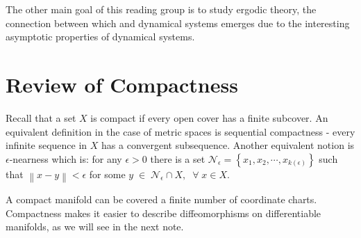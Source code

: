 \documentclass[11pt]{article}
\newcommand{\norm}[1]{\left\lVert#1\right\rVert}
\begin{document}
The other main goal of this reading group is to study ergodic theory, the connection between 
which and dynamical systems emerges due to the interesting asymptotic
properties of dynamical systems. 


\section*{Review of Compactness}

Recall that a set $X$ is compact if every open cover has a finite subcover. An equivalent
definition in the case of metric spaces is sequential compactness - every 
infinite sequence in $X$ has a convergent subsequence. Another equivalent
notion is $\epsilon$-nearness which is: for any 
$\epsilon > 0$ there 
is a set $\mathcal{N}_\epsilon = \left\{ x_1, x_2, \cdots, x_{k(\epsilon)}  \right\}$ such that $\norm{x-y} < \epsilon$ for some $y \;\in\; \mathcal{N}_\epsilon\cap X,\;\;\forall\;x \in X$.  

A compact manifold can be covered a finite number of coordinate charts. Compactness makes it easier to describe diffeomorphisms on 
differentiable manifolds, as we will see in the next note.



\end{document}
